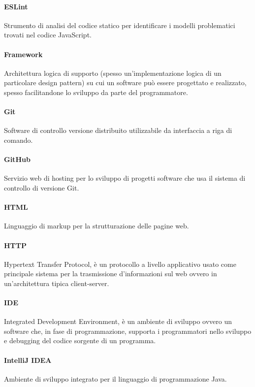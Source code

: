 	\paragraph*{ESLint}
	Strumento di analisi del codice statico per identificare i modelli problematici trovati nel codice JavaScript.
	
	\paragraph*{Framework}
	Architettura logica di supporto (spesso un'implementazione logica di un particolare design pattern) su cui un software può essere progettato e realizzato, spesso facilitandone lo sviluppo da parte del programmatore.
	
	\paragraph*{Git}
	Software di controllo versione distribuito utilizzabile da interfaccia a riga di comando.
	
	\paragraph*{GitHub}
	Servizio web di hosting per lo sviluppo di progetti software che usa il sistema di controllo di versione Git.
	
	\paragraph*{HTML}
	Linguaggio di markup per la strutturazione delle pagine web.
	
	\paragraph*{HTTP}
	Hypertext Transfer Protocol, è un protocollo a livello applicativo usato come principale sistema per la trasmissione d'informazioni sul web ovvero in un'architettura tipica client-server.
	
	\paragraph*{IDE}
	Integrated Development Environment, è un ambiente di sviluppo ovvero un software che, in fase di programmazione, supporta i programmatori nello sviluppo e debugging del codice sorgente di un programma.
	
	\paragraph*{IntelliJ IDEA}
	Ambiente di sviluppo integrato per il linguaggio di programmazione Java.
	
